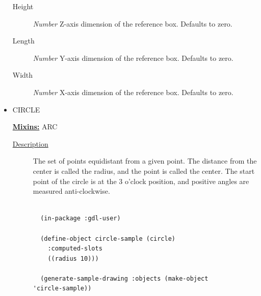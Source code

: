 \documentclass [11pt]{book}
\begin{document}
\begin{itemize}
\begin{description}
\item [Height]
\emph{Number} Z-axis dimension of the reference box. Defaults to zero.


\item [Length]
\emph{Number} Y-axis dimension of the reference box. Defaults to zero.


\item [Width]
\emph{Number} X-axis dimension of the reference box. Defaults to zero.


\end{description}







\item {}CIRCLE


\textbf{
\underline{Mixins:}} ARC





\begin{description}

\item [
\underline{Description}]


The set of points equidistant from a given point. 
The distance from the center is called the radius, and the point is called 
the center. The start point of the circle is at the 3 o'clock position, and positive
angles are measured anti-clockwise.



\end{description}




\begin{figure}
\begin{lrbox}{\boxedverb}
\begin{minipage}{\linewidth}
{\small

\begin{verbatim}

  (in-package :gdl-user)
                  
  (define-object circle-sample (circle)
    :computed-slots
    ((radius 10)))

  (generate-sample-drawing :objects (make-object 'circle-sample))

                  

\end{verbatim}}
\end{minipage}
\end{lrbox}
\fbox{\usebox{\boxedverb}}


\end{figure}
\end{itemize}
\end{document}
